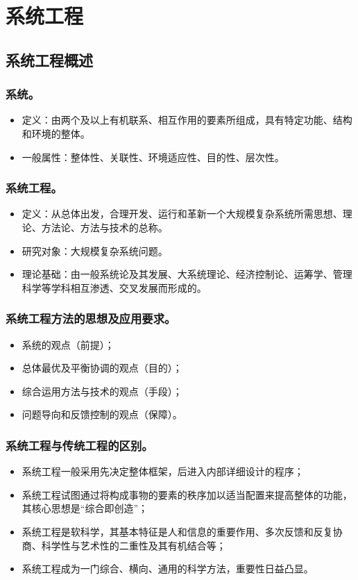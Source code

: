 \documentclass{article}
\begin{document}
\newpage

\section{系统工程}

\subsection{系统工程概述}

\subsubsection{系统。}
\begin{itemize}
    \item 定义：由两个及以上有机联系、相互作用的要素所组成，具有特定功能、结构和环境的整体。
    \item 一般属性：整体性、关联性、环境适应性、目的性、层次性。
\end{itemize}

\subsubsection{系统工程。}
\begin{itemize}
    \item 定义：从总体出发，合理开发、运行和革新一个大规模复杂系统所需思想、理论、方法论、方法与技术的总称。
    \item 研究对象：大规模复杂系统问题。
    \item 理论基础：由一般系统论及其发展、大系统理论、经济控制论、运筹学、管理科学等学科相互渗透、交叉发展而形成的。
\end{itemize}

\subsubsection{系统工程方法的思想及应用要求。}
\begin{itemize}
    \item 系统的观点（前提）；
    \item 总体最优及平衡协调的观点（目的）；
    \item 综合运用方法与技术的观点（手段）；
    \item 问题导向和反馈控制的观点（保障）。
\end{itemize}

\subsubsection{系统工程与传统工程的区别。}
\begin{itemize}
    \item 系统工程一般采用先决定整体框架，后进入内部详细设计的程序；
    \item 系统工程试图通过将构成事物的要素的秩序加以适当配置来提高整体的功能，其核心思想是“综合即创造”；
    \item 系统工程是软科学，其基本特征是人和信息的重要作用、多次反馈和反复协商、科学性与艺术性的二重性及其有机结合等；
    \item 系统工程成为一门综合、横向、通用的科学方法，重要性日益凸显。
\end{itemize}
\end{document}
